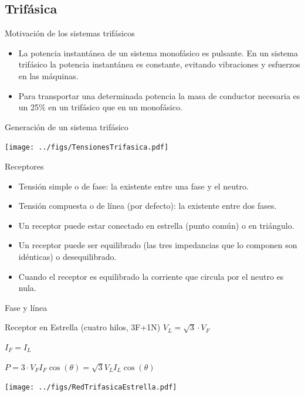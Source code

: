 \documentclass[xcolor={usenames,svgnames,dvipsnames}]{beamer}
\begin{document}
\subsection{Trifásica}
\label{sec:org700b085}

\begin{frame}[label={sec:org1fed369}]{Motivación de los sistemas trifásicos}
\begin{itemize}
\item La potencia instantánea de un sistema monofásico es pulsante. En un
sistema trifásico la potencia instantánea es constante, evitando
vibraciones y esfuerzos en las máquinas.

\item Para transportar una determinada potencia la masa de conductor
necesaria es un 25\% en un trifásico que en un monofásico.
\end{itemize}
\end{frame}

\begin{frame}[label={sec:orgba1426f}]{Generación de un sistema trifásico}
\begin{center}
\texttt{[image: ../figs/TensionesTrifasica.pdf]}
\end{center}
\end{frame}

\begin{frame}[label={sec:org71589d3}]{Receptores}
\begin{itemize}
\item \alert{Tensión simple o de fase}: la existente entre una fase y el neutro.
\item \alert{Tensión compuesta o de línea} (por defecto): la existente entre dos fases.
\item Un receptor puede estar conectado en \alert{estrella} (punto común) o en \alert{triángulo}.
\item Un receptor puede ser \alert{equilibrado} (las tres impedancias que lo componen son idénticas) o \alert{desequilibrado}.
\item Cuando el receptor es equilibrado la corriente que circula por el neutro es nula.
\end{itemize}
\end{frame}

\begin{frame}[label={sec:orgb1ba865}]{Fase y línea}
\begin{block}{Receptor en Estrella (cuatro hilos, 3F+1N)}
\(V_{L}=\sqrt{3}\cdot V_{F}\) 

\(I_{F}=I_{L}\)

\(P=3\cdot V_{F}I_{F}\cos(\theta)=\sqrt{3}V_{L}I_{L}\cos(\theta)\)
\begin{center}
\texttt{[image: ../figs/RedTrifasicaEstrella.pdf]}
\end{center}
\end{block}
\end{frame}
\end{document}
